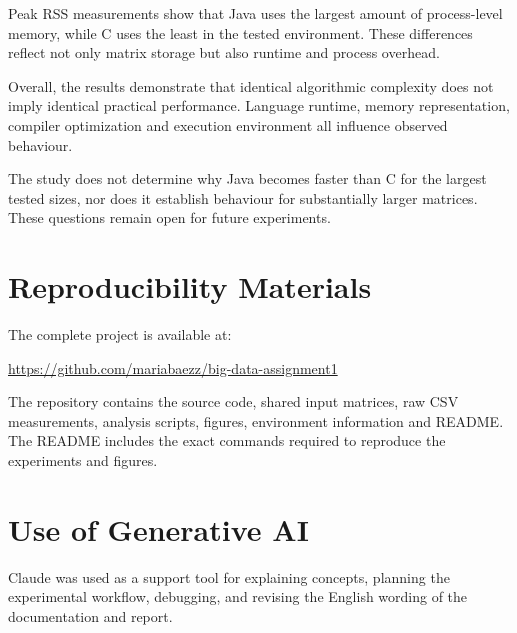 \documentclass[11pt,a4paper]{article}
\begin{document}
Peak RSS measurements show that Java uses the largest amount of process-level memory, while C uses the least in the tested environment. These differences reflect not only matrix storage but also runtime and process overhead.

Overall, the results demonstrate that identical algorithmic complexity does not imply identical practical performance. Language runtime, memory representation, compiler optimization and execution environment all influence observed behaviour.

The study does not determine why Java becomes faster than C for the largest tested sizes, nor does it establish behaviour for substantially larger matrices. These questions remain open for future experiments.

\section{Reproducibility Materials}

The complete project is available at:

\url{https://github.com/mariabaezz/big-data-assignment1}

The repository contains the source code, shared input matrices, raw CSV measurements, analysis scripts, figures, environment information and README. The README includes the exact commands required to reproduce the experiments and figures.

\section*{Use of Generative AI}

Claude was used as a support tool for explaining concepts, planning the experimental workflow, debugging, and revising the English wording of the documentation and report.



\end{document}
